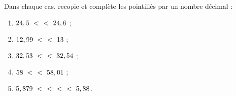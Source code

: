 \begin{exercice}
Dans chaque cas, recopie et complète les pointillés par un nombre décimal :
\begin{enumerate} 
 \item $24,5 < \dotfill < 24,6$ ; \hspace*{13em} 
 
 \item $12,99 < \dotfill < 13$ ; \hspace*{13.5em}
 
 \item $32,53 < \dotfill < 32,54$ ; \hspace*{12em}
 
 \item $58 < \dotfill < 58,01$ ; \hspace*{13.5em}
 
 \item $5,879 < \dotfill < \dotfill < \dotfill < 5,88$. \hspace*{5em}

 \end{enumerate}
\end{exercice}




